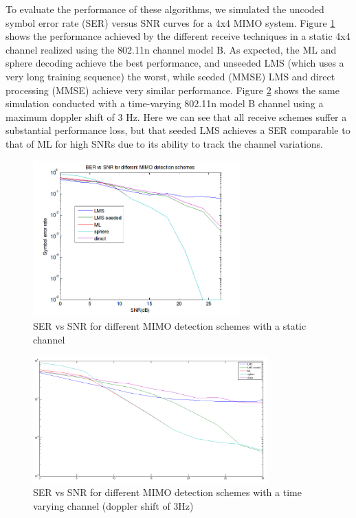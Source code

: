 \documentclass[journal]{IEEEtran}
\begin{document}
To evaluate the performance of these algorithms, we simulated the uncoded symbol error rate (SER) versus SNR curves for a 4x4 MIMO system. Figure \ref{ser_snr_different_schemes_static} shows the performance achieved by the different receive techniques in a static 4x4 channel realized using the 802.11n channel model B. As expected, the ML and sphere decoding achieve the best performance, and unseeded LMS (which uses a very long training sequence) the worst, while seeded (MMSE) LMS and direct processing (MMSE) achieve very similar performance. Figure \ref{ser_snr_different_schemes_dynamic} shows the same simulation conducted with a time-varying 802.11n model B channel using a maximum doppler shift of 3 Hz. Here we can see that all receive schemes suffer a substantial performance loss, but that seeded LMS achieves a SER comparable to that of ML for high SNRs due to its ability to track the channel variations. 

\begin{figure}
\centering
\includegraphics[width=8cm]{images/static_channel_decoder_comparison.png}
\caption{SER vs SNR for different MIMO detection schemes with a static channel}
\label{ser_snr_different_schemes_static}
\end{figure}

\begin{figure}
\centering
\includegraphics[width=9cm]{images/time_varying_channel_doppler_3.png}
\caption{SER vs SNR for different MIMO detection schemes with a time varying channel (doppler shift of 3Hz)}
\label{ser_snr_different_schemes_dynamic}
\end{figure}
\end{document}
